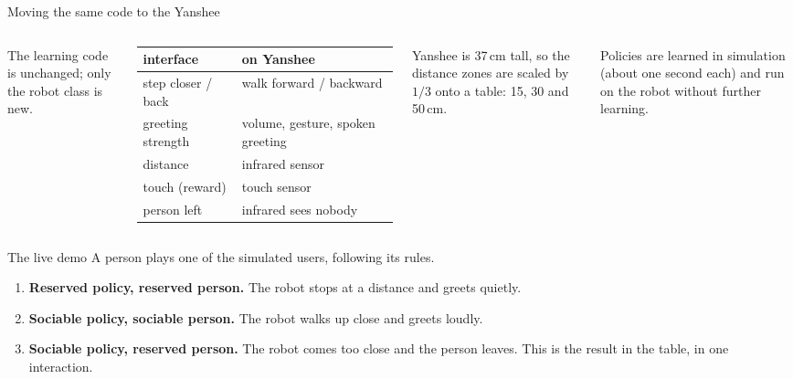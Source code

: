 \documentclass[aspectratio=169,10pt]{beamer}
\begin{document}
\begin{frame}{Moving the same code to the Yanshee}
\begin{columns}[T]
\centering
{}

\medskip
{\small The learning code is unchanged; only the robot class is new.}

\small
\begin{tabular}{@{}ll@{}}
\toprule
interface & on Yanshee \\
\midrule
step closer / back & walk forward / backward \\
greeting strength & volume, gesture, spoken greeting \\
distance & infrared sensor \\
touch (reward) & touch sensor \\
person left & infrared sees nobody \\
\bottomrule
\end{tabular}

\medskip
Yanshee is 37\,cm tall, so the distance zones are scaled by $1/3$ onto a
table: 15, 30 and 50\,cm.

\medskip
Policies are learned in simulation (about one second each) and run on the
robot without further learning.
\end{columns}
\end{frame}

\begin{frame}{The live demo}
A person plays one of the simulated users, following its rules.

\begin{enumerate}
  \item \textbf{Reserved policy, reserved person.} The robot stops at a
        distance and greets quietly.
  \item \textbf{Sociable policy, sociable person.} The robot walks up close
        and greets loudly.
  \item \textbf{Sociable policy, reserved person.} The robot comes too close and
        the person leaves. This is the result in the table, in one interaction.
\end{enumerate}
\end{frame}
\end{document}

